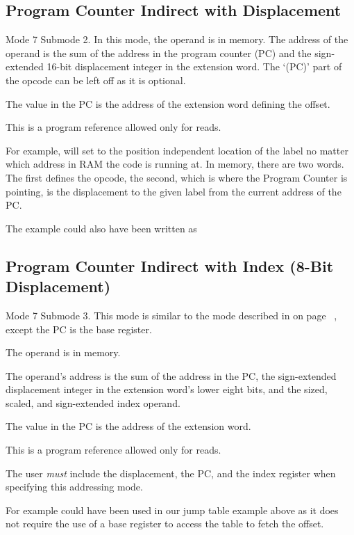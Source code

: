 \subsection{Program Counter Indirect with Displacement}
Mode 7 Submode 2. In this mode, the operand is in memory. The address of the operand is the sum of the address in the program counter (PC) and the sign-extended 16-bit displacement integer in the extension word. The `(PC)' part of the opcode can be left off as it is optional.

The value in the PC is the address of the extension word defining the offset. 

This is a program reference allowed only for reads.

For example,  will set  to the position independent location of the label  no matter which address in RAM the code is running at. In memory, there are two words. The first defines the opcode, the second, which is where the Program Counter is pointing, is the displacement to the given label from the current address of the PC.

The example could also have been written as 

\subsection{Program Counter Indirect with Index (8-Bit Displacement)}
Mode 7 Submode 3. This mode is similar to the mode described in \emph{} on page~\pageref{sub-ARegII8} , except the PC is the base register. 

The operand is in memory.

The operand’s address is the sum of the address in the PC, the sign-extended displacement
integer in the extension word’s lower eight bits, and the sized, scaled, and sign-extended index operand. 

The value in the PC is the address of the extension word. 

This is a program reference allowed only for reads. 

The user \emph{must} include the displacement, the PC, and the index register when specifying this addressing mode.

For example  could have been used in our jump table example above as it does not require the use of a base register to access the table to fetch the offset.

